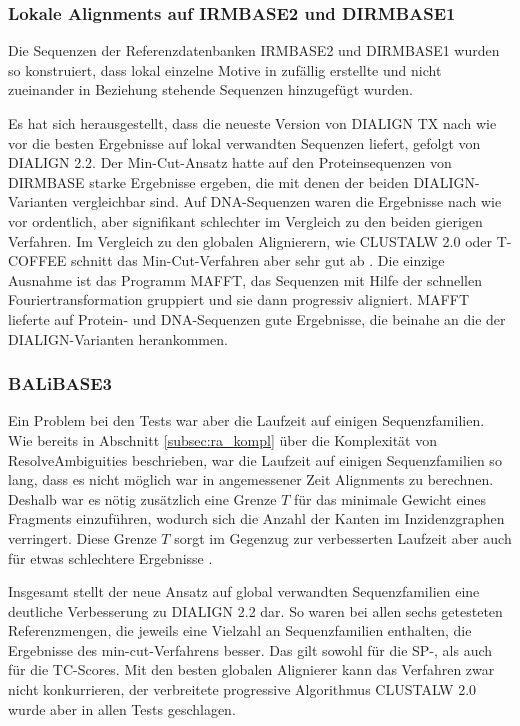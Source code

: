 \subsubsection{Lokale Alignments auf IRMBASE2 und DIRMBASE1}

Die Sequenzen der Referenzdatenbanken IRMBASE2 und DIRMBASE1 wurden so konstruiert, dass lokal einzelne Motive in zufällig erstellte und nicht zueinander in Beziehung stehende Sequenzen hinzugefügt wurden.

Es hat sich herausgestellt, dass die neueste Version von DIALIGN TX nach wie vor die besten Ergebnisse auf lokal verwandten Sequenzen liefert, gefolgt von DIALIGN 2.2. Der Min-Cut-Ansatz hatte auf den Proteinsequenzen von DIRMBASE starke Ergebnisse ergeben, die mit denen der beiden DIALIGN-Varianten vergleichbar sind. Auf DNA-Sequenzen waren die Ergebnisse nach wie vor ordentlich, aber signifikant schlechter im Vergleich zu den beiden gierigen Verfahren. Im Vergleich zu den globalen Alignierern, wie CLUSTALW 2.0 oder T-COFFEE schnitt das Min-Cut-Verfahren aber sehr gut ab \cite{cpm10}. Die einzige Ausnahme ist das Programm MAFFT, das Sequenzen mit Hilfe der schnellen Fouriertransformation gruppiert und sie dann progressiv aligniert. MAFFT lieferte auf Protein- und DNA-Sequenzen gute Ergebnisse, die beinahe an die der DIALIGN-Varianten herankommen.

\subsubsection{BALiBASE3}

Ein Problem bei den Tests war aber die Laufzeit auf einigen Sequenzfamilien. Wie bereits in Abschnitt \ref{subsec:ra_kompl} über die Komplexität von \textrm{ResolveAmbiguities} beschrieben, war die Laufzeit auf einigen Sequenzfamilien so lang, dass es nicht möglich war in angemessener Zeit Alignments zu berechnen. Deshalb war es nötig zusätzlich eine Grenze $T$ für das minimale Gewicht eines Fragments einzuführen, wodurch sich die Anzahl der Kanten im Inzidenzgraphen verringert. Diese Grenze $T$ sorgt im Gegenzug zur verbesserten Laufzeit aber auch für etwas schlechtere Ergebnisse \cite{cpm10}.

Insgesamt stellt der neue Ansatz auf global verwandten Sequenzfamilien eine deutliche Verbesserung zu DIALIGN 2.2 dar. So waren bei allen sechs getesteten Referenzmengen, die jeweils eine Vielzahl an Sequenzfamilien enthalten, die Ergebnisse des min-cut-Verfahrens besser. Das gilt sowohl für die SP-, als auch für die TC-Scores. Mit den besten globalen Alignierer kann das Verfahren zwar nicht konkurrieren, der verbreitete progressive Algorithmus CLUSTALW 2.0 wurde aber in allen Tests geschlagen. 

